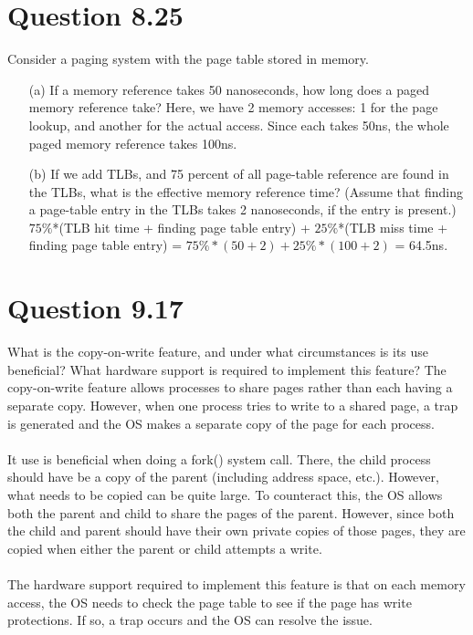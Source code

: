 \documentclass[12pt]{article}
\begin{document}
\section*{Question 8.25}{\color{blue}Consider a paging system with the page table stored in memory.
\begin{enumerate}
\item[(a)]If a memory reference takes 50 nanoseconds, how long does a paged memory reference take? {\color{black}
Here, we have 2 memory accesses: 1 for the page lookup, and another for the actual access. Since each takes 50ns, the whole paged memory reference takes 100ns.
}
\item[(b)]If we add TLBs, and 75 percent of all page-table reference are found in the TLBs, what is the effective memory reference time? (Assume that finding a page-table entry in the TLBs takes 2 nanoseconds, if the entry is present.) {\color{black} 
$75\%$*(TLB hit time + finding page table entry) + $25\%$*(TLB miss time + finding page table entry) = $75\%*(50+2) + 25\%*(100+2)$ =  64.5ns.
}
\end{enumerate}
}

\section*{Question 9.17}{\color{blue}What is the copy-on-write feature, and under what circumstances is its use beneficial? What hardware support is required to implement this feature?} The copy-on-write feature allows processes to share pages rather than each having a separate copy. However, when one process tries to write to a shared page, a trap is generated and the OS makes a separate copy of the page for each process. 
\\ \\
It use is beneficial when doing a fork() system call. There, the child process should have be a copy of the parent (including address space, etc.). However, what needs to be copied can be quite large. To counteract this, the OS allows both the parent and child to share the pages of the parent. However, since both the child and parent should have their own private copies of those pages, they are copied when either the parent or child attempts a write.
\\ \\
The hardware support required to implement this feature is that on each memory access, the OS needs to check the page table to see if the page has write protections. If so, a trap occurs and the OS can resolve the issue.
\end{document}

